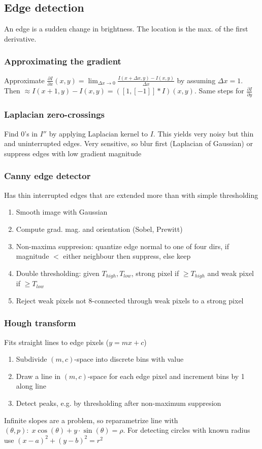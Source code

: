 \documentclass[a4paper,10pt]{article}
\begin{document}
\subsection{Edge detection}
An edge is a sudden change in brightness. The location is the max. of the first derivative.
\subsubsection{Approximating the gradient} Approximate \( \frac{\partial I}{\partial x}(x,y) = \lim_{\Delta x \to 0} \frac{I(x + \Delta x, y) - I(x,y)}{\Delta x} \) by assuming \( \Delta x = 1 \). Then \( \approx I(x+1, y) - I(x,y) = ([1,[-1]] * I)(x,y) \). Same steps for \( \frac{\partial I}{\partial y} \)
\subsubsection{Laplacian zero-crossings} Find 0's in \( I'' \) by applying Laplacian kernel to \( I \). This yields very noisy but thin and uninterrupted edges. Very sensitive, so blur first (Laplacian of Gaussian) or suppress edges with low gradient magnitude
\subsubsection{Canny edge detector} Has thin interrupted edges that are extended more than with simple thresholding
    \begin{enumerate}
	\item Smooth image with Gaussian
	\item Compute grad. mag. and orientation (Sobel, Prewitt)
	\item Non-maxima suppresion: quantize edge normal to one of four dirs, if magnitude \( <\) either neighbour then suppress, else keep
	\item Double thresholding: given \( T_{high}, T_{low} \), strong pixel if \( \ge T_{high} \) and weak pixel if \( \ge T_{low} \) 
	\item Reject weak pixels not 8-connected through weak pixels to a strong pixel
    \end{enumerate}
\subsubsection{Hough transform} Fits straight lines to edge pixels (\( y = mx + c \))
    \begin{enumerate}
	\item Subdivide \( (m, c) \)-space into discrete bins with value 
	\item Draw a line in \( (m,c) \)-space for each edge pixel and increment bins by 1 along line
	\item Detect peaks, e.g. by thresholding after non-maximum suppresion
    \end{enumerate}
    Infinite slopes are a problem, so reparametrize line with \( (\theta , p): \; x \cos (\theta ) + y \cdot \sin (\theta ) = \rho  \). For detecting circles with known radius use \( (x-a)^2+(y-b)^2 = r^2 \)
\end{document}
